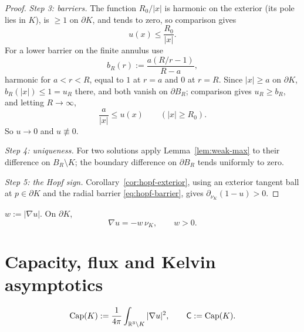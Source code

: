 \begin{proof}
\emph{Step 3: barriers.}  The function $R_0/|x|$ is harmonic on the exterior
(its pole lies in $K$), is $\ge1$ on $\partial K$, and tends to zero, so
comparison gives
\begin{equation}\label{eq:upper-barrier}
  u(x)\le\frac{R_0}{|x|}.
\end{equation}
For a lower barrier on the finite annulus use
\begin{equation}\label{eq:lower-barrier-annulus}
  b_R(r):=\frac{a(R/r-1)}{R-a},
\end{equation}
harmonic for $a<r<R$, equal to $1$ at $r=a$ and $0$ at $r=R$.  Since
$|x|\ge a$ on $\partial K$, $b_R(|x|)\le1=u_R$ there, and both vanish on
$\partial B_R$; comparison gives $u_R\ge b_R$, and letting $R\to\infty$,
\begin{equation}\label{eq:lower-barrier}
  \frac a{|x|}\le u(x)\qquad(|x|\ge R_0).
\end{equation}
So $u\to0$ and $u\not\equiv0$.

\emph{Step 4: uniqueness.}  For two solutions apply
Lemma~\ref{lem:weak-max} to their difference on $B_R\setminus K$; the boundary
difference on $\partial B_R$ tends uniformly to zero.

\emph{Step 5: the Hopf sign.}  Corollary~\ref{cor:hopf-exterior}, using an
exterior tangent ball at $p\in\partial K$ and the radial barrier
\eqref{eq:hopf-barrier}, gives $\partial_{\nu_K}(1-u)>0$.
\end{proof}

\begin{notation}[$w$]\label{not:w}
$w:=|\nabla u|$.  On $\partial K$,
\begin{equation}\label{eq:w-boundary}
  \nabla u=-w\,\nu_K,\qquad w>0 .
\end{equation}
\end{notation}

\section{Capacity, flux and Kelvin asymptotics}

\begin{definition}[Capacity]\label{def:capacity}
\begin{equation}\label{eq:capacity}
  \operatorname{Cap}(K):=\frac1{4\pi}\int_{\mathbb R^3\setminus K}|\nabla u|^2 ,
  \qquad
  \mathsf C:=\operatorname{Cap}(K).
\end{equation}
\end{definition}

